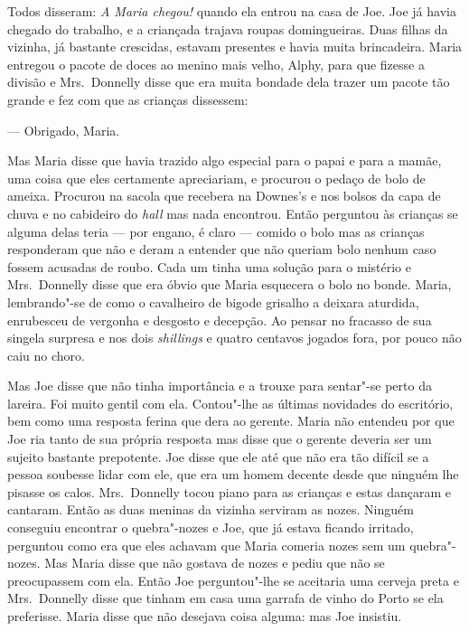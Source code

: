 Todos disseram: \textit{A Maria chegou!} quando ela entrou na casa de Joe.  Joe
já havia chegado do trabalho, e a criançada trajava roupas domingueiras.  Duas
filhas da vizinha, já bastante crescidas, estavam presentes e havia muita
brincadeira.  Maria entregou o pacote de doces ao menino mais velho, Alphy,
para que fizesse a divisão e Mrs.~Donnelly disse que era muita bondade dela
trazer um pacote tão grande e fez com que as crianças dissessem:

--- Obrigado, Maria.

Mas Maria disse que havia trazido algo especial para o papai e para a mamãe,
uma coisa que eles certamente apreciariam, e procurou o pedaço de bolo de
ameixa.  Procurou na sacola que recebera na Downes’s e nos bolsos da capa de
chuva e no cabideiro do \textit{hall} mas nada encontrou.  Então perguntou às
crianças se alguma delas teria --- por engano, é claro --- comido o bolo
mas as crianças responderam que não e deram a entender que não queriam bolo
nenhum caso fossem acusadas de roubo.  Cada um tinha uma solução para o
mistério e Mrs.~Donnelly disse que era óbvio que Maria esquecera o bolo no
bonde.  Maria, lembrando"-se de como o cavalheiro de bigode grisalho a deixara
aturdida, enrubesceu de vergonha e desgosto e decepção.  Ao pensar no fracasso
de sua singela surpresa e nos dois \textit{shillings} e quatro centavos jogados
fora, por pouco não caiu no choro.

Mas Joe disse que não tinha importância e a trouxe para sentar"-se perto da
lareira.  Foi muito gentil com ela.  Contou"-lhe as últimas novidades do
escritório, bem como uma resposta ferina que dera ao gerente.  Maria não
entendeu por que Joe ria tanto de sua própria resposta mas disse que o gerente
deveria ser um sujeito bastante prepotente.  Joe disse que ele até que não era
tão difícil se a pessoa soubesse lidar com ele, que era um homem decente desde
que ninguém lhe pisasse os calos.  Mrs.~Donnelly tocou piano para as crianças
e estas dançaram e cantaram.  Então as duas meninas da vizinha serviram as
nozes.  Ninguém conseguiu encontrar o quebra"-nozes e Joe, que já estava ficando
irritado, perguntou como era que eles achavam que Maria comeria nozes sem um
quebra"-nozes.  Mas Maria disse que não gostava de nozes e pediu que não se
preocupassem com ela.  Então Joe perguntou"-lhe se aceitaria uma cerveja preta e
Mrs.~Donnelly disse que tinham em casa uma garrafa de vinho do Porto se ela
preferisse.  Maria disse que não desejava coisa alguma: mas Joe insistiu.

